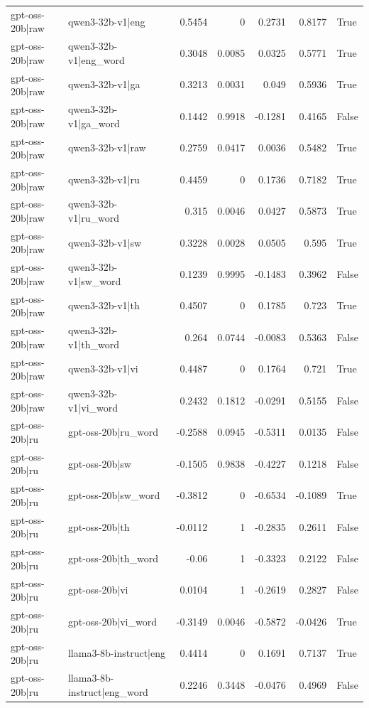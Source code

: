 \begin{table}
\begin{tabular}{l l r r r r l}
gpt-oss-20b|raw & qwen3-32b-v1|eng & 0.5454 & 0 & 0.2731 & 0.8177 & True \\
gpt-oss-20b|raw & qwen3-32b-v1|eng_word & 0.3048 & 0.0085 & 0.0325 & 0.5771 & True \\
gpt-oss-20b|raw & qwen3-32b-v1|ga & 0.3213 & 0.0031 & 0.049 & 0.5936 & True \\
gpt-oss-20b|raw & qwen3-32b-v1|ga_word & 0.1442 & 0.9918 & -0.1281 & 0.4165 & False \\
gpt-oss-20b|raw & qwen3-32b-v1|raw & 0.2759 & 0.0417 & 0.0036 & 0.5482 & True \\
gpt-oss-20b|raw & qwen3-32b-v1|ru & 0.4459 & 0 & 0.1736 & 0.7182 & True \\
gpt-oss-20b|raw & qwen3-32b-v1|ru_word & 0.315 & 0.0046 & 0.0427 & 0.5873 & True \\
gpt-oss-20b|raw & qwen3-32b-v1|sw & 0.3228 & 0.0028 & 0.0505 & 0.595 & True \\
gpt-oss-20b|raw & qwen3-32b-v1|sw_word & 0.1239 & 0.9995 & -0.1483 & 0.3962 & False \\
gpt-oss-20b|raw & qwen3-32b-v1|th & 0.4507 & 0 & 0.1785 & 0.723 & True \\
gpt-oss-20b|raw & qwen3-32b-v1|th_word & 0.264 & 0.0744 & -0.0083 & 0.5363 & False \\
gpt-oss-20b|raw & qwen3-32b-v1|vi & 0.4487 & 0 & 0.1764 & 0.721 & True \\
gpt-oss-20b|raw & qwen3-32b-v1|vi_word & 0.2432 & 0.1812 & -0.0291 & 0.5155 & False \\
gpt-oss-20b|ru & gpt-oss-20b|ru_word & -0.2588 & 0.0945 & -0.5311 & 0.0135 & False \\
gpt-oss-20b|ru & gpt-oss-20b|sw & -0.1505 & 0.9838 & -0.4227 & 0.1218 & False \\
gpt-oss-20b|ru & gpt-oss-20b|sw_word & -0.3812 & 0 & -0.6534 & -0.1089 & True \\
gpt-oss-20b|ru & gpt-oss-20b|th & -0.0112 & 1 & -0.2835 & 0.2611 & False \\
gpt-oss-20b|ru & gpt-oss-20b|th_word & -0.06 & 1 & -0.3323 & 0.2122 & False \\
gpt-oss-20b|ru & gpt-oss-20b|vi & 0.0104 & 1 & -0.2619 & 0.2827 & False \\
gpt-oss-20b|ru & gpt-oss-20b|vi_word & -0.3149 & 0.0046 & -0.5872 & -0.0426 & True \\
gpt-oss-20b|ru & llama3-8b-instruct|eng & 0.4414 & 0 & 0.1691 & 0.7137 & True \\
gpt-oss-20b|ru & llama3-8b-instruct|eng_word & 0.2246 & 0.3448 & -0.0476 & 0.4969 & False \\

\end{tabular}
\end{table}
